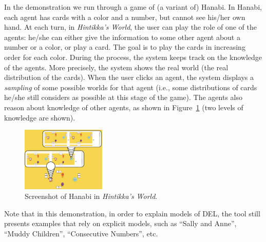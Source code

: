 
In the demonstration we run through a game of (a variant of) Hanabi. 
In Hanabi, each agent has cards with a color and a
number, but cannot see his/her own hand.
At each turn, in \emph{Hintikka's World}, the user can play the role of one of the agents: he/she can either give the information to some other agent about a number or a color, or play a card. The goal is to play the cards in increasing order for each color.
During the process, the system keeps track on the knowledge of the agents.
More precisely, the system shows the real world (the real distribution of the cards). When the user clicks an agent, the system displays a \emph{sampling} of some possible worlds for that agent (i.e., some distributions of cards he/she still considers as possible at this stage of the game). The agents also reason about knowledge of other agents, as shown in Figure~\ref{figure:guihanabi} (two levels of knowledge are shown).
%
%
%


\begin{figure}
	\begin{center}
		\includegraphics[width=4cm]{images/HW_screenshot_hanabi.png}
	\end{center}
\vspace{-3mm}
	\caption{Screenshot of Hanabi in \emph{Hintikka's World}.\label{figure:guihanabi}}
\end{figure}

Note that in this demonstration, in order to explain models of DEL, the tool still presents examples that rely on explicit models, such as ``Sally and Anne'', ``Muddy Children'', ``Consecutive Numbers'', etc.
